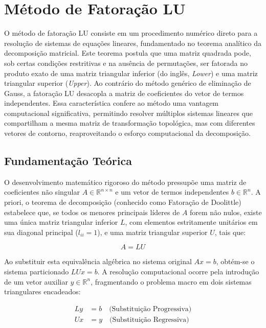 \section{Método de Fatoração LU}

O método de fatoração LU consiste em um procedimento numérico direto para a resolução de sistemas de equações lineares, fundamentado no teorema analítico da decomposição matricial. Este teorema postula que uma matriz quadrada pode, sob certas condições restritivas e na ausência de permutações, ser fatorada no produto exato de uma matriz triangular inferior (do inglês, \textit{Lower}) e uma matriz triangular superior (\textit{Upper}). Ao contrário do método genérico de eliminação de Gauss, a fatoração LU desacopla a matriz de coeficientes do vetor de termos independentes. Essa característica confere ao método uma vantagem computacional significativa, permitindo resolver múltiplos sistemas lineares que compartilham a mesma matriz de transformação topológica, mas com diferentes vetores de contorno, reaproveitando o esforço computacional da decomposição.

\subsection{Fundamentação Teórica}

O desenvolvimento matemático rigoroso do método pressupõe uma matriz de coeficientes não singular $A \in \mathbb{R}^{n \times n}$ e um vetor de termos independentes $b \in \mathbb{R}^{n}$. A priori, o teorema de decomposição (conhecido como Fatoração de Doolittle) estabelece que, se todos os menores principais líderes de $A$ forem não nulos, existe uma única matriz triangular inferior $L$, com elementos estritamente unitários em sua diagonal principal ($l_{ii} = 1$), e uma matriz triangular superior $U$, tais que:

\begin{equation}
    A = LU
\end{equation}

Ao substituir esta equivalência algébrica no sistema original $Ax = b$, obtém-se o sistema particionado $LUx = b$. A resolução computacional ocorre pela introdução de um vetor auxiliar $y \in \mathbb{R}^{n}$, fragmentando o problema macro em dois sistemas triangulares encadeados:

\begin{align}
    Ly &= b \quad \text{(Substituição Progressiva)} \\
    Ux &= y \quad \text{(Substituição Regressiva)}
\end{align}

